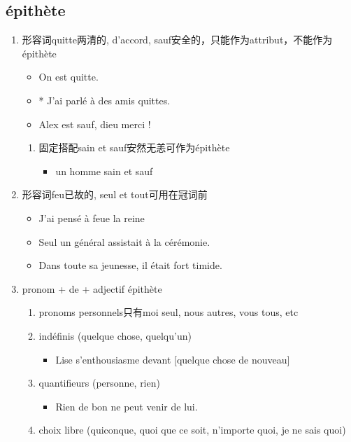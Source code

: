 \documentclass[UTF8]{report}
\begin{document}
\subsection{épithète}

\begin{enumerate}
    \item 形容词quitte两清的, d’accord, sauf安全的，只能作为attribut，不能作为épithète
    \begin{itemize}
        \item On est quitte.
        \item * J’ai parlé à des amis quittes.
        \item Alex est sauf, dieu merci !
    \end{itemize}
    \begin{enumerate}
        \item 固定搭配sain et sauf安然无恙可作为épithète
        \begin{itemize}
            \item un homme sain et sauf
        \end{itemize}
    \end{enumerate}
    \item 形容词feu已故的, seul et tout可用在冠词前
    \begin{itemize}
        \item J’ai pensé à feue la reine
        \item Seul un général assistait à la cérémonie.
        \item Dans toute sa jeunesse, il était fort timide.
    \end{itemize}
    \item pronom + de + adjectif épithète
    \begin{enumerate}
        \item pronoms personnels只有moi seul, nous autres, vous tous, etc
        \item indéfinis (quelque chose, quelqu’un)
        \begin{itemize}
            \item Lise s’enthousiasme devant [quelque chose de nouveau] 
        \end{itemize}
        \item quantifieurs (personne, rien)
        \begin{itemize}
            \item Rien de bon ne peut venir de lui.
        \end{itemize}
        \item choix libre (quiconque, quoi que ce soit, n’importe quoi, je ne sais quoi)

\end{enumerate}
\end{enumerate}
\end{document}

